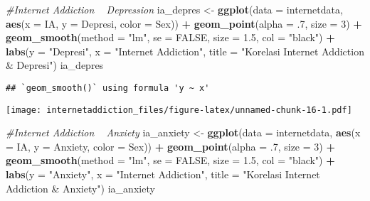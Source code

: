 \documentclass[
]{article}
\newenvironment{Shaded}{\begin{snugshade}}{\end{snugshade}}
\newcommand{\CommentTok}[1]{\textcolor[rgb]{0.56,0.35,0.01}{\textit{#1}}}
\newcommand{\DataTypeTok}[1]{\textcolor[rgb]{0.13,0.29,0.53}{#1}}
\newcommand{\DecValTok}[1]{\textcolor[rgb]{0.00,0.00,0.81}{#1}}
\newcommand{\FloatTok}[1]{\textcolor[rgb]{0.00,0.00,0.81}{#1}}
\newcommand{\KeywordTok}[1]{\textcolor[rgb]{0.13,0.29,0.53}{\textbf{#1}}}
\newcommand{\NormalTok}[1]{#1}
\newcommand{\OperatorTok}[1]{\textcolor[rgb]{0.81,0.36,0.00}{\textbf{#1}}}
\newcommand{\OtherTok}[1]{\textcolor[rgb]{0.56,0.35,0.01}{#1}}
\newcommand{\StringTok}[1]{\textcolor[rgb]{0.31,0.60,0.02}{#1}}
\begin{document}
\begin{Shaded}
\begin{Highlighting}[]
\CommentTok{#Internet Addiction ~ Depression }
\NormalTok{ia_depres <-}\StringTok{ }\KeywordTok{ggplot}\NormalTok{(}\DataTypeTok{data =}\NormalTok{ internetdata, }
                    \KeywordTok{aes}\NormalTok{(}\DataTypeTok{x =}\NormalTok{ IA, }
                        \DataTypeTok{y =}\NormalTok{ Depresi,}
                        \DataTypeTok{color =}\NormalTok{ Sex)) }\OperatorTok{+}
\StringTok{  }\KeywordTok{geom_point}\NormalTok{(}\DataTypeTok{alpha =} \FloatTok{.7}\NormalTok{,}
             \DataTypeTok{size =} \DecValTok{3}\NormalTok{) }\OperatorTok{+}
\StringTok{  }\KeywordTok{geom_smooth}\NormalTok{(}\DataTypeTok{method =} \StringTok{"lm"}\NormalTok{, }
              \DataTypeTok{se =} \OtherTok{FALSE}\NormalTok{,}
              \DataTypeTok{size =} \FloatTok{1.5}\NormalTok{,}
              \DataTypeTok{col =} \StringTok{"black"}\NormalTok{) }\OperatorTok{+}
\StringTok{  }\KeywordTok{labs}\NormalTok{(}\DataTypeTok{y =} \StringTok{"Depresi"}\NormalTok{,}
       \DataTypeTok{x =} \StringTok{"Internet Addiction"}\NormalTok{, }
       \DataTypeTok{title =} \StringTok{"Korelasi Internet Addiction & Depresi"}\NormalTok{) }
\NormalTok{ia_depres}
\end{Highlighting}
\end{Shaded}

\begin{verbatim}
## `geom_smooth()` using formula 'y ~ x'
\end{verbatim}

\texttt{[image: internetaddiction\_files/figure-latex/unnamed-chunk-16-1.pdf]}

\begin{Shaded}
\begin{Highlighting}[]
\CommentTok{#Internet Addiction ~ Anxiety}
\NormalTok{ia_anxiety <-}\StringTok{ }\KeywordTok{ggplot}\NormalTok{(}\DataTypeTok{data =}\NormalTok{ internetdata, }
                    \KeywordTok{aes}\NormalTok{(}\DataTypeTok{x =}\NormalTok{ IA, }
                        \DataTypeTok{y =}\NormalTok{ Anxiety,}
                        \DataTypeTok{color =}\NormalTok{ Sex)) }\OperatorTok{+}
\StringTok{  }\KeywordTok{geom_point}\NormalTok{(}\DataTypeTok{alpha =} \FloatTok{.7}\NormalTok{,}
             \DataTypeTok{size =} \DecValTok{3}\NormalTok{) }\OperatorTok{+}
\StringTok{  }\KeywordTok{geom_smooth}\NormalTok{(}\DataTypeTok{method =} \StringTok{"lm"}\NormalTok{, }
              \DataTypeTok{se =} \OtherTok{FALSE}\NormalTok{,}
              \DataTypeTok{size =} \FloatTok{1.5}\NormalTok{,}
              \DataTypeTok{col =} \StringTok{"black"}\NormalTok{) }\OperatorTok{+}
\StringTok{  }\KeywordTok{labs}\NormalTok{(}\DataTypeTok{y =} \StringTok{"Anxiety"}\NormalTok{,}
       \DataTypeTok{x =} \StringTok{"Internet Addiction"}\NormalTok{, }
       \DataTypeTok{title =} \StringTok{"Korelasi Internet Addiction & Anxiety"}\NormalTok{) }
\NormalTok{ia_anxiety}
\end{Highlighting}
\end{Shaded}
\end{document}
